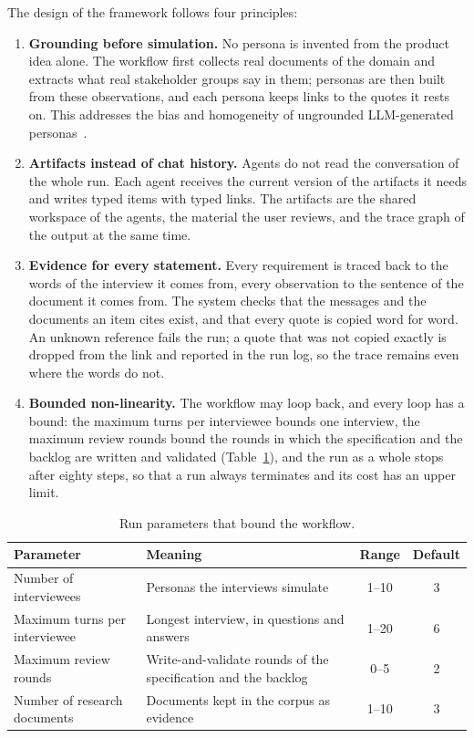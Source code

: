 The design of the framework follows four principles:
\begin{enumerate}
    \item \textbf{Grounding before simulation.} No persona is invented from the product idea alone. The workflow first collects real documents of the domain and extracts what real stakeholder groups say in them; personas are then built from these observations, and each persona keeps links to the quotes it rests on. This addresses the bias and homogeneity of ungrounded LLM-generated personas~\cite{li2026persona}.
    \item \textbf{Artifacts instead of chat history.} Agents do not read the conversation of the whole run. Each agent receives the current version of the artifacts it needs and writes typed items with typed links. The artifacts are the shared workspace of the agents, the material the user reviews, and the trace graph of the output at the same time.
    \item \textbf{Evidence for every statement.} Every requirement is traced back to the words of the interview it comes from, every observation to the sentence of the document it comes from. The system checks that the messages and the documents an item cites exist, and that every quote is copied word for word. An unknown reference fails the run; a quote that was not copied exactly is dropped from the link and reported in the run log, so the trace remains even where the words do not.
    \item \textbf{Bounded non-linearity.} The workflow may loop back, and every loop has a bound: the maximum turns per interviewee bounds one interview, the maximum review rounds bound the rounds in which the specification and the backlog are written and validated (Table~\ref{tab:pa-run-parameters}), and the run as a whole stops after eighty steps, so that a run always terminates and its cost has an upper limit.
\end{enumerate}

\begin{table}[H]
    \centering
    \caption{Run parameters that bound the workflow.}
    \label{tab:pa-run-parameters}
    \begin{tabularx}{\linewidth}{|l|X|c|c|}
        \hline
        \textbf{Parameter} & \textbf{Meaning} & \textbf{Range} & \textbf{Default} \\
        \hline
        Number of interviewees & Personas the interviews simulate & 1--10 & 3 \\
        Maximum turns per interviewee & Longest interview, in questions and answers & 1--20 & 6 \\
        Maximum review rounds & Write-and-validate rounds of the specification and the backlog & 0--5 & 2 \\
        Number of research documents & Documents kept in the corpus as evidence & 1--10 & 3 \\
        \hline
    \end{tabularx}
\end{table}
